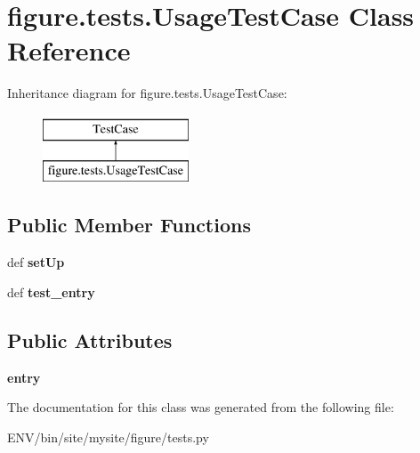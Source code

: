 \hypertarget{classfigure_1_1tests_1_1UsageTestCase}{\section{figure.\-tests.\-Usage\-Test\-Case Class Reference}
\label{classfigure_1_1tests_1_1UsageTestCase}
}
Inheritance diagram for figure.\-tests.\-Usage\-Test\-Case\-:\begin{figure}[H]
\begin{center}
\leavevmode
\includegraphics[height=2.000000cm]{classfigure_1_1tests_1_1UsageTestCase}
\end{center}
\end{figure}
\subsection*{Public Member Functions}
\begin{DoxyCompactItemize}
\item 
\hypertarget{classfigure_1_1tests_1_1UsageTestCase_aea573172c8adea7c9350c494fab990d0}{def {\bfseries set\-Up}}\label{classfigure_1_1tests_1_1UsageTestCase_aea573172c8adea7c9350c494fab990d0}

\item 
\hypertarget{classfigure_1_1tests_1_1UsageTestCase_a22b29774c4bccde7385957207932eeef}{def {\bfseries test\-\_\-entry}}\label{classfigure_1_1tests_1_1UsageTestCase_a22b29774c4bccde7385957207932eeef}

\end{DoxyCompactItemize}
\subsection*{Public Attributes}
\begin{DoxyCompactItemize}
\item 
\hypertarget{classfigure_1_1tests_1_1UsageTestCase_a5f98717de545f3b5302a2aef59ccd384}{{\bfseries entry}}\label{classfigure_1_1tests_1_1UsageTestCase_a5f98717de545f3b5302a2aef59ccd384}

\end{DoxyCompactItemize}


The documentation for this class was generated from the following file\-:\begin{DoxyCompactItemize}
\item 
E\-N\-V/bin/site/mysite/figure/tests.\-py\end{DoxyCompactItemize}
